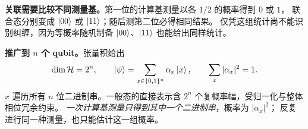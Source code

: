 \textbf{关联需要比较不同测量基。}第一位的计算基测量以各 $1/2$ 的概率得到 $0$ 或 $1$，
联合态分别变成 $\left|00\right\rangle$ 或 $\left|11\right\rangle$；随后测第二位必得相同结果。
仅凭这组统计尚不能识别纠缠，因为等概率随机制备 $\left|00\right\rangle$、$\left|11\right\rangle$ 也能给出同样统计。


\textbf{推广到 $n$ 个 qubit。}张量积给出
\begin{equation*}
  \dim\mathcal{H}=2^n,\qquad
  \left|\psi\right\rangle=\sum_{x\in\{0,1\}^n}\alpha_x\left|x\right\rangle,\qquad
  \sum_x|\alpha_x|^2=1.
\end{equation*}
$x$ 遍历所有 $n$ 位二进制串。一般态的直接表示含 $2^n$ 个复概率幅，受归一化与整体相位冗余约束。
\emph{一次计算基测量只得到其中一个二进制串}，概率为 $|\alpha_x|^2$；
反复进行同一种测量，也只能估计这一组概率。
